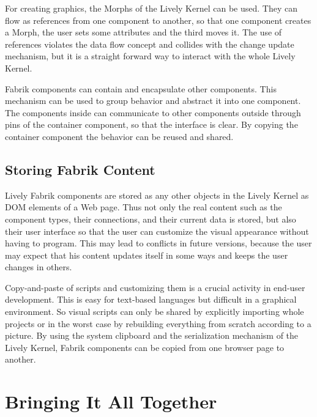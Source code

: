 \documentclass[pdftex, times, 10pt, twocolumn]{article}
\begin{document}
For creating graphics, the Morphs of the Lively Kernel can be used. They can flow as references from one component to another, so that one component creates a Morph, the user sets some attributes and the third moves it. The use of references violates the data flow concept and collides with the change update mechanism, but it is a straight forward way to interact with the whole Lively Kernel. 

Fabrik components can contain and encapsulate other components. This mechanism can be used to group behavior and abstract it into one component. The components inside can communicate to other components outside through pins of the container component, so that the interface is clear. By copying the container component the behavior can be reused and shared. 



\subsection{Storing Fabrik Content}
Lively Fabrik components are stored as any other objects in the Lively Kernel as DOM elements of a Web page. Thus not only the real content such as the component types, their connections, and their current data is stored, but also their user interface so that the user can customize the visual appearance without having to program. This may lead to conflicts in future versions, because the user may expect that his content updates itself in some ways and keeps the user changes in others.  

Copy-and-paste of scripts and customizing them is a crucial activity in end-user development.  This is easy for text-based languages but difficult in a graphical environment.  So visual scripts can only be shared by explicitly importing whole projects or in the worst case by rebuilding everything from scratch according to a picture.  By using the system clipboard and the serialization mechanism of the Lively Kernel, Fabrik components can be copied from one browser page to another. 



\section{Bringing It All Together}
\end{document}
